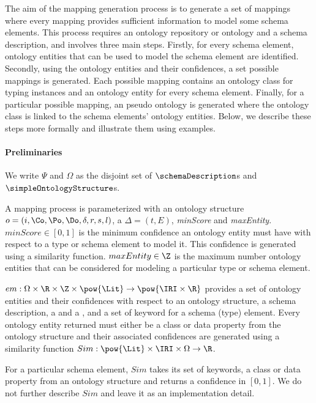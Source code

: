 The aim of the mapping generation process is to generate a set of mappings where every mapping provides sufficient information to model some schema elements. This process requires an ontology repository or ontology and a schema description, and involves three main steps. Firstly, for every schema element, ontology entities that can be used to model the schema element are identified. Secondly, using the ontology entities and their confidences, a set possible mappings is generated. Each possible mapping contains an ontology class for typing instances and an ontology entity for every schema element. Finally, for a particular possible mapping, an pseudo ontology is generated where the ontology class is linked to the schema elements' ontology entities. Below, we describe these steps more formally and illustrate them using examples.
  	
  	\paragraph{Preliminaries} We write $\Psi$ and $\Omega$ as the disjoint set of $\schemaDescription$s and $\simpleOntologyStructure$s.
  	
  	A mapping process is parameterized with an ontology structure $o=(i,\Co,\Po,\Do,\delta,r,s,l)$, a \schemaDescription $\Delta=(t,E)$, \emph{minScore} and \emph{maxEntity}. $minScore\in[0,1]$ is the minimum confidence an ontology entity must have with respect to a type or schema element to model it. This confidence is generated using a similarity function. $maxEntity\in\Z$ is the maximum number ontology entities that can be considered for modeling a particular type or schema element. 
    
    
    $em:\Omega\times\R\times\Z\times\pow{\Lit}\rightarrow\pow{\IRI\times\R}$ provides a set of ontology entities and their confidences with respect to an ontology structure, a schema description, a \minScore and a \maxEntity, and a set of keyword for a schema (type) element. Every ontology entity returned must either be a class or data property from the ontology structure and their associated confidences are generated using a similarity function $Sim:\pow{\Lit}\times\IRI\times\Omega\rightarrow\R$. 
    
    For a particular schema element, $Sim$ takes its set of keywords, a class or data property from an ontology structure and returns a confidence in $[0,1]$. We do not further describe $Sim$ and leave it as an implementation detail. 
    
